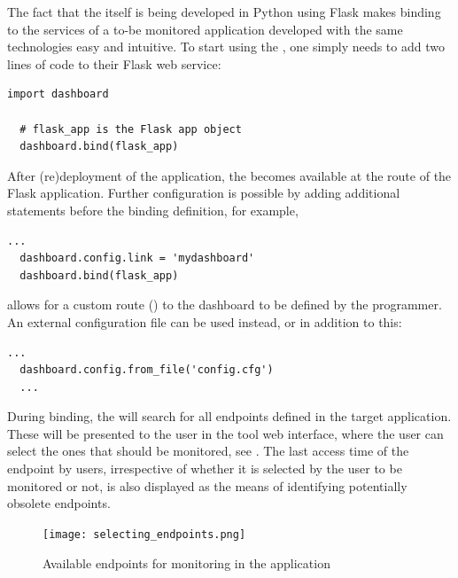 \documentclass{sig-alternate-05-2015}
\begin{document}
  The fact that the \tool itself is being developed in Python using Flask makes binding to the services of a to-be monitored application developed with the same technologies easy and intuitive. 
  To start using the \tool, one simply needs to add two lines of code to their Flask web service:

  \begin{lstlisting}[style=custompython]
  import dashboard

  # flask_app is the Flask app object
  dashboard.bind(flask_app)
  \end{lstlisting}

  After (re)deployment of the application, the \tool becomes available at the  route of the Flask application. Further configuration is possible by adding additional statements before the binding definition, for example,

  \begin{lstlisting}[style=custompython]
  ...
  dashboard.config.link = 'mydashboard'
  dashboard.bind(flask_app)
  \end{lstlisting}
  
  allows for a custom route () to the dashboard to be defined by the programmer. An external configuration file can be used instead, or in addition to this:
  
  \begin{lstlisting}[style=custompython]
  ...
  dashboard.config.from_file('config.cfg')
  ...
  \end{lstlisting}

  During binding, the \tool will search for all endpoints defined in the target application. These will be presented to the user in the tool web interface, where the user can select the ones that should be monitored, see . The last access time of the endpoint by users, irrespective of whether it is selected by the user to be monitored or not, is also displayed as the means of identifying potentially obsolete endpoints.

    \begin{figure}
      \centering
      \texttt{[image: selecting\_endpoints.png]}
      \caption{Available endpoints for monitoring in the \zee application}
      \label{fig:sep}
    \end{figure}
\end{document}
